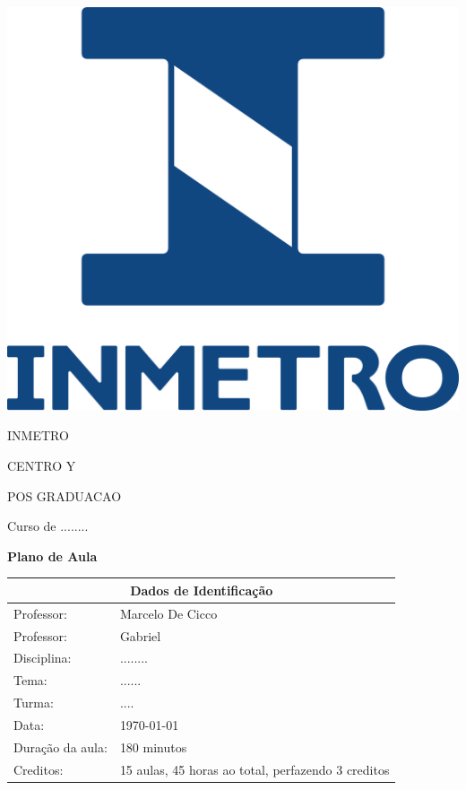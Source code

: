 \documentclass[oneside,a4paper,12pt]{article}
\newcommand{\universidade}{INMETRO}
\newcommand{\centro}{CENTRO Y}
\newcommand{\departamento}{POS GRADUACAO}
\newcommand{\curso}{........}
\newcommand{\professores}{Marcelo De Cicco}
\newcommand{\professoresg}{Gabriel}
\newcommand{\disciplina}{........}
\newcommand{\tema}{......}
\newcommand{\turma}{....}
\newcommand{\data}{\today}
\newcommand{\tempodeaula}{180 minutos}
\newcommand{\creditos}{15 aulas, 45 horas ao total, perfazendo 3 creditos}
\begin{document}
	\pagestyle{empty}
	
	\begin{center}
		\includegraphics[width=\linewidth/5]{inmetro-logo.png}%
	 	\vspace{2pt} 	
		
		\universidade
		\par
		\centro
		\par
		\departamento
		\par
		Curso de \curso
		\par
		\vspace{12pt}
		\LARGE \textbf{Plano de Aula}
		
	\end{center}
	
	\vspace{12pt}
	
	\begin{tabular}{ |l|p{12cm}| }
		
		\hline
		\multicolumn{2}{|c|}{\textbf{Dados de Identificação}} \\
		\hline
		Professor:         &    \professores           \\
		\hline
		Professor:         &    \professoresg           \\
		\hline
		Disciplina:        &    \disciplina          \\
		\hline
		Tema:              &    \tema                \\
		\hline
		Turma:             &    \turma               \\
		\hline
		Data:              &    \data                \\
		\hline
		Duração da aula:   &    \tempodeaula         \\
		\hline
			Creditos:   &    \creditos         \\
		\hline
		
		
		
		
	\end{tabular}
	\vspace{12pt}
	
\end{document}
